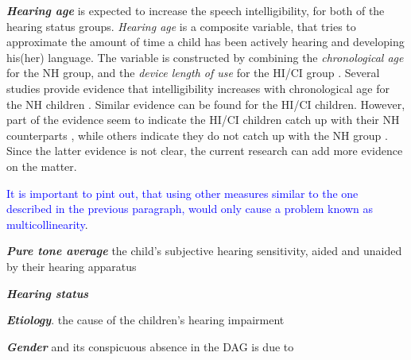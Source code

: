 \textbf{\textit{Hearing age}} is expected to increase the speech intelligibility, for both of the hearing status groups. \textit{Hearing age} is a composite variable, that tries to approximate the amount of time a child has been actively hearing and developing his(her) language. The variable is constructed by combining the \textit{chronological age} for the NH group, and the \textit{device length of use} for the HI/CI group \citep{Faes_et_al_2021}. Several studies provide evidence that intelligibility increases with chronological age for the NH children \cite{Baudonck_et_al_2009, Bowen_2011, Chin_et_al_2001, Chin_et_al_2003, Flipsen_2006, Flipsen_2008, Hustad_et_al_2020}. Similar evidence can be found for the HI/CI children. However, part of the evidence seem to indicate the HI/CI children catch up with their NH counterparts \cite{Wie_2010, Habib_et_al_2010, Boons_et_al_2013, Geers_et_al_2013, Bruijnzeel_et_al_2016, Dettman_et_al_2016, Wie_et_al_2020}, while others indicate they do not catch up with the NH group \cite{Nicholas_et_al_2007, Castellanos_et_al_2014, Chin_et_al_2014, Geers_et_al_2016, Freeman_et_al_2017, Duchesne_et_al_2019, Grandon_et_al_2020}. Since the latter evidence is not clear, the current research can add more evidence on the matter.

\textcolor{blue}{It is important to pint out, that using other measures similar to the one described in the previous paragraph, would only cause a problem known as multicollinearity}. 

\begin{comment}
the previous analysis, the best fitting model contained the variable Chronological Age. Adding other variables to the model, including Hearing Age, Age at Implantation, Gender, Etiology, (Un)aided PTA, or Bilateral versus Monolateral implants, did not ameliorate the model fit, and hence did not explain a significant portion of the variance.
\end{comment}

\textbf{\textit{Pure tone average}} the child's subjective hearing sensitivity, aided and unaided by their hearing apparatus

\textbf{\textit{Hearing status}}

\textbf{\textit{Etiology}}. the cause of the children's hearing impairment

\textbf{\textit{Gender}} and its conspicuous absence in the DAG is due to 


